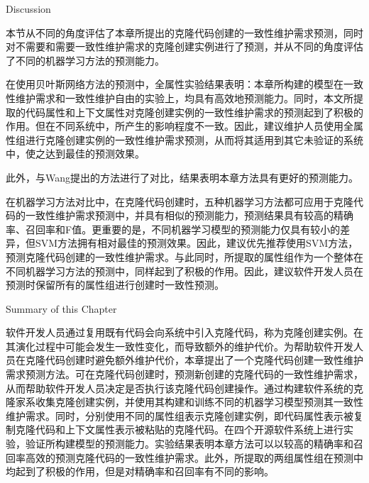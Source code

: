 {Discussion}

本节从不同的角度评估了本章所提出的克隆代码创建的一致性维护需求预测，同时对不需要和需要一致性维护需求的克隆创建实例进行了预测，并从不同的角度评估了不同的机器学习方法的预测能力。

在使用贝叶斯网络方法的预测中，全属性实验结果表明：本章所构建的模型在一致性维护需求和一致性维护自由的实验上，均具有高效地预测能力。同时，本文所提取的代码属性和上下文属性对克隆创建实例的一致性维护需求的预测起到了积极的作用。但在不同系统中，所产生的影响程度不一致。因此，建议维护人员使用全属性组进行克隆创建实例的一致性维护需求预测，从而将其适用到其它未验证的系统中，使之达到最佳的预测效果。

此外，与Wang提出的方法进行了对比，结果表明本章方法具有更好的预测能力。

在机器学习方法对比中，在克隆代码创建时，五种机器学习方法都可应用于克隆代码的一致性维护需求预测中，并具有相似的预测能力，预测结果具有较高的精确率、召回率和F值。更重要的是，不同机器学习模型的预测能力仅具有较小的差异，但SVM方法拥有相对最佳的预测效果。因此，建议优先推荐使用SVM方法，预测克隆代码创建的一致性维护需求。与此同时，所提取的属性组作为一个整体在不同机器学习方法的预测中，同样起到了积极的作用。因此，建议软件开发人员在预测时保留所有的属性组进行创建时一致性预测。

{Summary of this Chapter}

软件开发人员通过复用既有代码会向系统中引入克隆代码，称为克隆创建实例。在其演化过程中可能会发生一致性变化，而导致额外的维护代价。为帮助软件开发人员在克隆代码创建时避免额外维护代价，本章提出了一个克隆代码创建一致性维护需求预测方法。可在克隆代码创建时，预测新创建的克隆代码的一致性维护需求，从而帮助软件开发人员决定是否执行该克隆代码创建操作。通过构建软件系统的克隆家系收集克隆创建实例，并使用其构建和训练不同的机器学习模型预测其一致性维护需求。同时，分别使用不同的属性组表示克隆创建实例，即代码属性表示被复制克隆代码和上下文属性表示被粘贴的克隆代码。在四个开源软件系统上进行实验，验证所构建模型的预测能力。实验结果表明本章方法可以以较高的精确率和召回率高效的预测克隆代码的一致性维护需求。此外，所提取的两组属性组在预测中均起到了积极的作用，但是对精确率和召回率有不同的影响。



